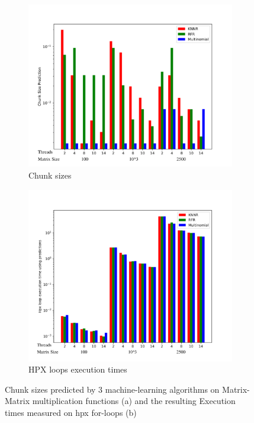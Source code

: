 \begin{figure}[h]
	\centering
	\begin{subfigure}[b]{0.5\textwidth}
		\centering
		\includegraphics[width=\textwidth]{images/bars_matrix_cs.pdf}
		\caption[Network2]%
		{{Chunk sizes}}    
	\end{subfigure}
	\hfill
	\begin{subfigure}[b]{0.49\textwidth}  
		\centering 
		\includegraphics[width=\textwidth]{images/bars_matrix_times.pdf}
		\caption[]%
		{{HPX loops execution times}}    
	\end{subfigure}
	\caption{Chunk sizes predicted by 3 machine-learning algorithms on Matrix-Matrix multiplication functions (a) and the resulting Execution times measured on hpx for-loops (b)} 
\end{figure}

